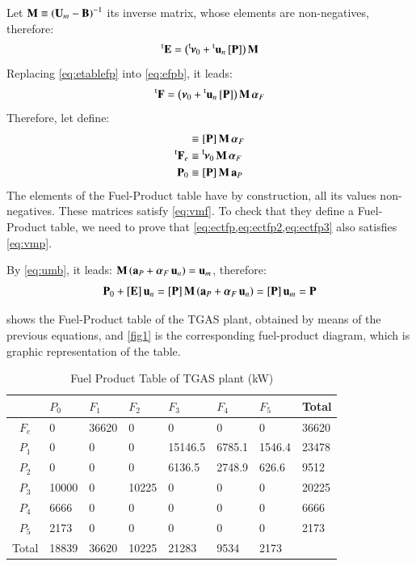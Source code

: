 \documentclass{ecos2018}
\begin{document}
Let ${\mathbf{M} \equiv \left(\mathbf{U}_m - \mathbf{B}\right)^{-1}}$ its inverse matrix, whose elements are non-negatives, therefore:
\begin{equation}
\label{eq:etablefp}
\prescript{\smash{\mathrm{t}}}{}{\mathbf{E}}=\left(\prescript{\smash{\mathsf{t}}}{}{\mskip-1mu}\bm{\nu}_0 +\prescript{\smash{\mathrm{t}}}{}{\mathbf{u}}_n\, [\mathbf{P}]\right)\mathbf{M}
\end{equation}
Replacing \cref{eq:etablefp} into \cref{eq:efpb}, it leads:
\begin{equation}
\prescript{\smash{\mathrm{t}}}{}{\mathbf{F}}=\left(\bm{\nu}_0 +\prescript{\smash{\mathrm{t}}}{}{\mathbf{u}}_n\, [\mathbf{P}]\right)\mathbf{M}\,\bm{\alpha}_F
\end{equation}
Therefore, let define:
\begin{align}
[\vm{E}] &\equiv [\vm{P}]\, \vm{M}\,\bm{\alpha}_F \label{eq:ectfp}\\
\tvm{F}_e &\equiv \tm\bm{\nu}_0\,\vm{M}\,\bm{\alpha}_F \label{eq:ectfp2}\\ 
\vm{P}_0 &\equiv [\vm{P}]\, \vm{M}\,\vm{a}_P \label{eq:ectfp3}
\end{align}
The elements of the Fuel-Product table have by construction, all its values non-negatives. 
These matrices satisfy \cref{eq:vmf}. To check that they define a Fuel-Product table, we need to prove that \cref{eq:ectfp,eq:ectfp2,eq:ectfp3} also satisfies \cref{eq:vmp}.

By \cref{eq:umb}, it leads: $\mathbf{M}\left(\mathbf{a}_P+\bm{\alpha}_F\,\mathbf{u}_n\right)=\mathbf{u}_m$, therefore:
\begin{equation}
\mathbf{P}_0+\left[ \textbf{E} \right]\mathbf{u}_n=\left[ \textbf{P} \right]\mathbf{M}\left(\mathbf{a}_P+\bm{\alpha}_F\,\mathbf{u}_n\right)=\left[ \textbf{P} \right]\mathbf{u}_m=\mathbf{P}
\end{equation}

 shows the Fuel-Product table of the TGAS plant, obtained by means of the previous equations, and \cref{fig1} is the corresponding fuel-product diagram, which is graphic representation of the table.
\begin{table}[htbp]
	\caption{Fuel Product Table of TGAS plant (kW)}
	\begin{tabularx}{0.85\textwidth}{cZZZZZZZ}
		\addlinespace
		\toprule
		& $P_0$    & $F_1$    & $F_2$   & $F_3$    & $F_4$    & $F_5$    & Total \\
		\midrule
		$F_e$    & 0     & 36620 & 0     & 0       & 0      & 0      & 36620 \\
		\midrule
		$P_1$    & 0     & 0     & 0     & 15146.5 & 6785.1 & 1546.4 & 23478 \\
		$P_2$    & 0     & 0     & 0     & 6136.5  & 2748.9 & 626.6  & 9512 \\
		$P_3$    & 10000 & 0     & 10225 & 0       & 0      & 0      & 20225 \\
		$P_4$    & 6666  & 0     & 0     & 0       & 0      & 0      & 6666 \\
		$P_5$    & 2173  & 0     & 0     & 0       & 0      & 0      & 2173 \\
		\midrule
		Total & 18839 & 36620 & 10225 & 21283 & 9534  & 2173  &  \\
		\bottomrule
	\end{tabularx}
	\label{tab2}
\end{table}
\end{document}
